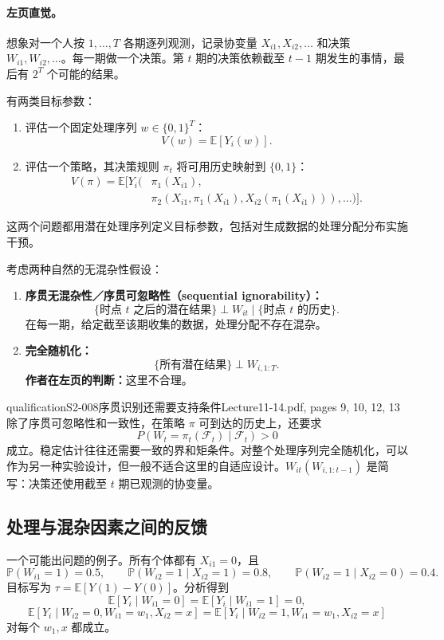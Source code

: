 \paragraph{左页直觉。}
想象对一个人按 $1,\ldots,T$ 各期逐列观测，记录协变量 $X_{i1},X_{i2},\ldots$ 和决策 $W_{i1},W_{i2},\ldots$。每一期做一个决策。第 $t$ 期的决策依赖截至 $t-1$ 期发生的事情，最后有 $2^T$ 个可能的结果。

有两类目标参数：
\begin{enumerate}
 \item 评估一个固定处理序列 $w\in\{0,1\}^T$：
 \[V(w)=\mathbb E[Y_i(w)].\]
 \item 评估一个策略，其决策规则 $\pi_t$ 将可用历史映射到 $\{0,1\}$：
 \begin{align*}
 V(\pi)=\mathbb E\bigl[Y_i\bigl(&\pi_1(X_{i1}),\\
 &\pi_2(X_{i1},\pi_1(X_{i1}),X_{i2}(\pi_1(X_{i1}))),\ldots\bigr)\bigr].\tag{12.2}
 \end{align*}
\end{enumerate}
这两个问题都用潜在处理序列定义目标参数，包括对生成数据的处理分配分布实施干预。

考虑两种自然的无混杂性假设：
\begin{enumerate}
 \item \textbf{序贯无混杂性／序贯可忽略性（sequential ignorability）：}
 \[
 \{\text{时点 }t\text{ 之后的潜在结果}\}\perp W_{it}
 \mid\{\text{时点 }t\text{ 的历史}\}.
 \]
 在每一期，给定截至该期收集的数据，处理分配不存在混杂。
 \item \textbf{完全随机化：}
 \[\{\text{所有潜在结果}\}\perp W_{i,1:T}.\]
 \textbf{作者在左页的判断：}这里不合理。
\end{enumerate}

\begin{reviewnote}{qualification}{S2-008}{序贯识别还需要支持条件}{Lecture11-14.pdf, pages 9, 10, 12, 13}
除了序贯可忽略性和一致性，在策略 $\pi$ 可到达的历史上，还要求
\[
 P(W_t=\pi_t(\mathcal F_t)\mid\mathcal F_t)>0
\]
成立。稳定估计往往还需要一致的界和矩条件。对整个处理序列完全随机化，可以作为另一种实验设计，但一般不适合这里的自适应设计。$W_{it}(W_{i,1:t-1})$ 是简写：决策还使用截至 $t$ 期已观测的协变量。
\end{reviewnote}


\subsection{处理与混杂因素之间的反馈}
一个可能出问题的例子。所有个体都有 $X_{i1}=0$，且
\[
 \mathbb P(W_{i1}=1)=0.5,\qquad
 \mathbb P(W_{i2}=1\mid X_{i2}=1)=0.8,\qquad
 \mathbb P(W_{i2}=1\mid X_{i2}=0)=0.4.
\]
目标写为 $\tau=\mathbb E[Y(1)-Y(0)]$。分析得到
\[
 \mathbb E[Y_i\mid W_{i1}=0]=\mathbb E[Y_i\mid W_{i1}=1]=0,
\]
\[
 \mathbb E[Y_i\mid W_{i2}=0,W_{i1}=w_1,X_{i2}=x]
 =\mathbb E[Y_i\mid W_{i2}=1,W_{i1}=w_1,X_{i2}=x]
\]
对每个 $w_1,x$ 都成立。

